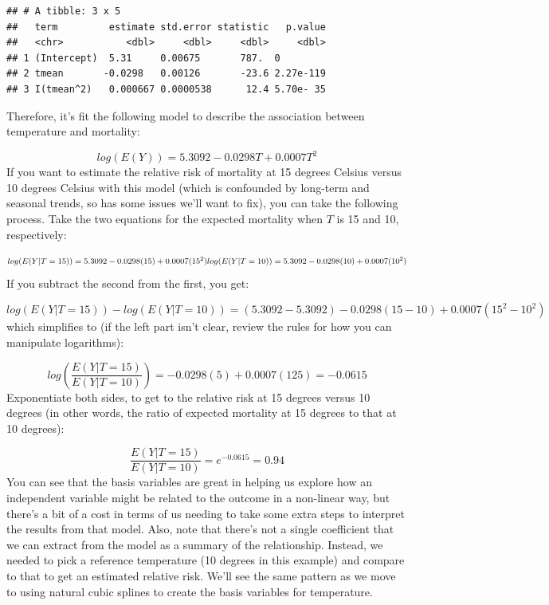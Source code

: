 \documentclass[
]{book}
\newenvironment{Shaded}{\begin{snugshade}}{\end{snugshade}}
\newcommand{\KeywordTok}[1]{\textcolor[rgb]{0.13,0.29,0.53}{\textbf{#1}}}
\newcommand{\NormalTok}[1]{#1}
\newcommand{\OperatorTok}[1]{\textcolor[rgb]{0.81,0.36,0.00}{\textbf{#1}}}
\newcommand{\StringTok}[1]{\textcolor[rgb]{0.31,0.60,0.02}{#1}}
\begin{document}
\begin{Shaded}
\end{Shaded}

\begin{verbatim}
## # A tibble: 3 x 5
##   term         estimate std.error statistic   p.value
##   <chr>           <dbl>     <dbl>     <dbl>     <dbl>
## 1 (Intercept)  5.31     0.00675       787.  0        
## 2 tmean       -0.0298   0.00126       -23.6 2.27e-119
## 3 I(tmean^2)   0.000667 0.0000538      12.4 5.70e- 35
\end{verbatim}

Therefore, it's fit the following model to describe the association between temperature and
mortality:

\[
log(E(Y)) = 5.3092 - 0.0298T + 0.0007T^2
\]
If you want to estimate the relative risk of mortality at 15 degrees Celsius versus 10
degrees Celsius with this model (which is confounded by long-term and seasonal trends, so
has some issues we'll want to fix), you can take the following process. Take the two
equations for the expected mortality when \(T\) is 15 and 10, respectively:

\[
log(E(Y|T=15)) = 5.3092 - 0.0298(15) + 0.0007(15^2) \\
log(E(Y|T=10)) = 5.3092 - 0.0298(10) + 0.0007(10^2)  
\]
If you subtract the second from the first, you get:

\[
log(E(Y|T=15)) - log(E(Y|T=10)) = (5.3092 - 5.3092) - 0.0298(15 - 10) + 0.0007(15^2 - 10^2)
\]
which simplifies to (if the left part isn't clear, review the rules for how you can manipulate
logarithms):

\[
log(\frac{E(Y|T=15)}{E(Y|T=10)}) = - 0.0298(5) + 0.0007(125) = -0.0615
\]
Exponentiate both sides, to get to the relative risk at 15 degrees versus 10 degrees (in
other words, the ratio of expected mortality at 15 degrees to that at 10 degrees):

\[
\frac{E(Y|T=15)}{E(Y|T=10)} = e^{-0.0615} =  0.94
\]
You can see that the basis variables are great in helping us explore how an independent
variable might be related to the outcome in a non-linear way, but there's a bit of a cost
in terms of us needing to take some extra steps to interpret the results from that model.
Also, note that there's not a single coefficient that we can extract from the model as
a summary of the relationship. Instead, we needed to pick a reference temperature (10 degrees
in this example) and compare to that to get an estimated relative risk. We'll see the
same pattern as we move to using natural cubic splines to create the basis variables for
temperature.
\end{document}
